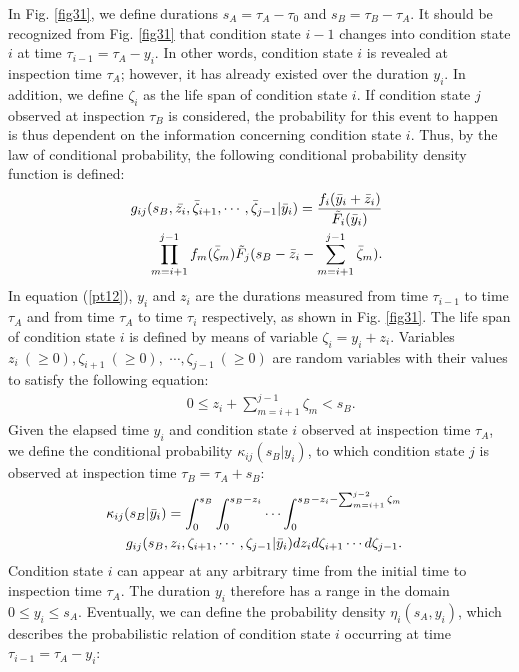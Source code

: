 In Fig. \ref{fig31}, we define durations $s_A=\tau_A-\tau_0$ and $s_B=\tau_B-\tau_A$. It should be recognized from Fig. \ref{fig31} that condition state $i-1$ changes into condition state $i$ at time $\tau_{i-1}=\tau_A-y_i$. In other words, condition state $i$ is revealed at inspection time $\tau_A$;  however, it has already existed over the duration $y_i$. In addition, we define $\zeta_i$ as the life span of condition state $i$. If condition state $j$ observed at inspection $\tau_B$ is considered, the probability for this event to happen is thus dependent on the information concerning condition state $i$. Thus, by the law of conditional probability, the following conditional probability density function is defined:
\begin{eqnarray}
&& \hspace{-5mm} g_{ij}(s_B,\bar{z_i},\bar{\zeta}_{i+1},\cdots,\bar{\zeta}_{j-1}|\bar{y}_i)=\frac{f_i(\bar{y}_i+\bar{z}_i)}{\tilde{F}_i(\bar{y}_i)} \nonumber \\
&& \prod_{m=i+1}^{j-1}f_m(\bar{\zeta}_m) \tilde{F}_j(s_B-\bar{z}_i-\sum_{m=i+1}^{j-1}\bar{\zeta}_m).
\label{pt12}
\end{eqnarray}
In equation (\ref{pt12}), $y_i$ and $z_i$ are the durations measured from time $\tau_{i-1}$ to time $\tau_A$ and from time $\tau_A$ to time $\tau_i$ respectively, as shown in Fig. \ref{fig31}. The life span of condition state $i$ is defined by means of variable $\zeta_i=y_i+z_i$. Variables $z_i~(\geq 0),\zeta_{i+1}~(\geq 0),$ $\cdots,\zeta_{j-1}~(\geq 0)$ are random variables with their values to satisfy the following equation:
\begin{eqnarray}
&& 0\leq z_i+\sum_{m=i+1}^{j-1} \zeta_m < s_B.
\end{eqnarray}
Given the elapsed time $y_i$ and condition state $i$ observed at inspection time $\tau_A$, we define the conditional probability $\kappa_{ij} (s_B|y_i)$, to which condition state $j$ is observed at inspection time $\tau_B=\tau_A+s_B$:
\begin{eqnarray}
\hspace{-3mm} \kappa_{ij}(s_B|\bar{y}_i)=\int_0^{s_B}\int_0^{s_B-z_i} \cdots \int_{0}^{s_B-z_i-\sum_{m=i+1}^{j-2}\zeta_m} \nonumber \\
\hspace{2mm} g_{ij}(s_B,z_i,\zeta_{i+1},\cdots,\zeta_{j-1}|\bar{y}_i)dz_i d\zeta_{i+1}\cdots d\zeta_{j-1}.
\end{eqnarray}
Condition state $i$ can appear at any arbitrary time from the initial time to inspection time $\tau_A$. The duration $y_i$ therefore has a range in the domain $0\leq y_i\leq s_A$. Eventually, we can define the probability density $\eta_{i} (s_A,y_i)$, which describes the probabilistic relation of condition state $i$ occurring at time $\tau_{i-1} = \tau_A-y_i$:
